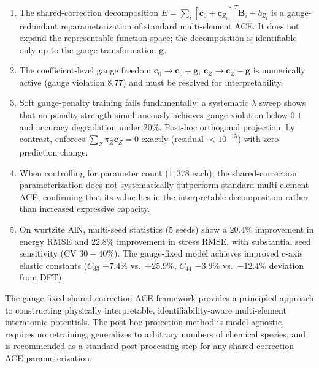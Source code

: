 \documentclass[twoside,prb,aps,floatfix,superscriptaddress,longbibliography]{revtex4-2}
\begin{document}
\begin{enumerate}[label=\textbf{(F\arabic*)}]
    \item The shared-correction decomposition $E = \sum_i [\mathbf{c}_0 + \mathbf{c}_{Z_i}]^T \mathbf{B}_i + b_{Z_i}$ is a gauge-redundant reparameterization of standard multi-element ACE. It does not expand the representable function space; the decomposition is identifiable only up to the gauge transformation $\mathbf{g}$.
    \item The coefficient-level gauge freedom $\mathbf{c}_0 \to \mathbf{c}_0 + \mathbf{g}$, $\mathbf{c}_Z \to \mathbf{c}_Z - \mathbf{g}$ is numerically active (gauge violation $8.77$) and must be resolved for interpretability.
    \item Soft gauge-penalty training fails fundamentally: a systematic $\lambda$ sweep shows that no penalty strength simultaneously achieves gauge violation below $0.1$ and accuracy degradation under $20\%$. Post-hoc orthogonal projection, by contrast, enforces $\sum_Z \pi_Z \mathbf{c}_Z = 0$ exactly (residual $< 10^{-15}$) with zero prediction change.
    \item When controlling for parameter count ($1{,}378$ each), the shared-correction parameterization does not systematically outperform standard multi-element ACE, confirming that its value lies in the interpretable decomposition rather than increased expressive capacity.
    \item On wurtzite AlN, multi-seed statistics ($5$ seeds) show a $20.4\%$ improvement in energy RMSE and $22.8\%$ improvement in stress RMSE, with substantial seed sensitivity (CV $30{-}40\%$). The gauge-fixed model achieves improved c-axis elastic constants ($C_{33}$ $+7.4\%$ vs.\ $+25.9\%$, $C_{44}$ $-3.9\%$ vs.\ $-12.4\%$ deviation from DFT).
\end{enumerate}

The gauge-fixed shared-correction ACE framework provides a principled approach to constructing physically interpretable, identifiability-aware multi-element interatomic potentials. The post-hoc projection method is model-agnostic, requires no retraining, generalizes to arbitrary numbers of chemical species, and is recommended as a standard post-processing step for any shared-correction ACE parameterization.

\begin{acknowledgments}
\end{acknowledgments}
\end{document}
